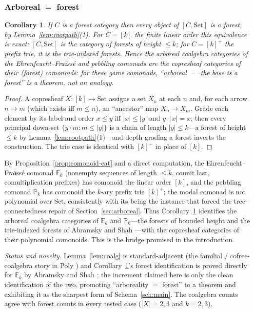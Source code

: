 \documentclass[11pt,reqno]{amsart}
\theoremstyle{plain}
\newtheorem{corollary}[theorem]{Corollary}
\theoremstyle{definition}
\newcommand{\Set}{\mathrm{Set}}
\newcommand{\EF}{\mathbb{E}}
\newcommand{\Peb}{\mathbb{P}}
\begin{document}
\subsubsection{Arboreal $=$ forest}
\begin{corollary}\label{cor:arboreal-forest}
If $C$ is a forest category then every object of $[C,\Set]$ is a forest, by Lemma~\ref{lem:rootpath}(1).
For $C = [k]$ the finite linear order this equivalence is exact: $[C,\Set]$ is the category of forests of
height $\le k$; for $C = [k]^{+}$ the prefix trie, it is the trie-indexed forests. Hence the arboreal
coalgebra categories of the Ehrenfeucht--Fra\"iss\'e and pebbling comonads are the copresheaf categories
of their (forest) comonoids: for these game comonads, ``\emph{arboreal $=$ the base is a forest}'' is a
theorem, not an analogy.
\end{corollary}

\begin{proof}
A copresheaf $X : [k] \to \Set$ assigns a set $X_n$ at each $n$ and, for each arrow $n \to m$ (which
exists iff $m \le n$), an ``ancestor'' map $X_n \to X_m$. Grade each element by its label and order
$x \le y$ iff $|x| \le |y|$ and $y \cdot |x| = x$; then every principal down-set
$\{y \cdot m : m \le |y|\}$ is a chain of length $|y| \le k$---a forest of height $\le k$ by
Lemma~\ref{lem:rootpath}(1)---and depth-grading a forest inverts the construction. The trie case is
identical with $[k]^{+}$ in place of $[k]$.
\end{proof}

By Proposition~\ref{prop:comonoid-cat} and a direct computation, the Ehrenfeucht--Fra\"iss\'e comonad
$\EF_k$ (nonempty sequences of length $\le k$, counit last, comultiplication prefixes) has comonoid the
linear order $[k]$, and the pebbling comonad $\Peb_k$ has comonoid the $k$-ary prefix trie $[k]^{+}$; the
modal comonad is not polynomial over $\Set$, consistently with its being the instance that forced the
tree-connectedness repair of Section~\ref{sec:arboreal}. Thus Corollary~\ref{cor:arboreal-forest}
identifies the arboreal coalgebra categories of $\EF_k$ and $\Peb_k$---the forests of bounded height and
the trie-indexed forests of Abramsky and Shah \cite{AbramskyShah2021}---with the copresheaf categories of
their polynomial comonoids. This is the bridge promised in the introduction.

\emph{Status and novelty.} Lemma~\ref{lem:coalg} is standard-adjacent (the familial / cofree-coalgebra
story in Poly \cite{SpivakGarnerFairbanks2025}) and Corollary~\ref{cor:arboreal-forest}'s forest
identification is proved directly for $\EF_k$ by Abramsky and Shah \cite{AbramskyShah2021}; the increment
claimed here is only the clean identification of the two, promoting ``arboreality $=$ forest'' to a
theorem and exhibiting it as the sharpest form of Schema~\ref{sch:main}. The coalgebra counts agree with
forest counts in every tested case ($|X|=2,3$ and $k=2,3$).
\end{document}
